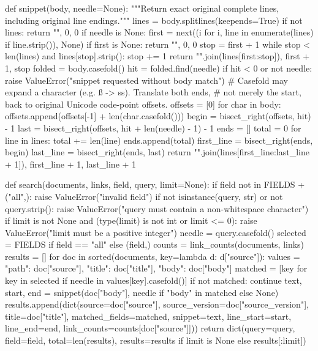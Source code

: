 def snippet(body, needle=None):
    """Return exact original complete lines, including original line endings."""
    lines = body.splitlines(keepends=True)
    if not lines:
        return "", 0, 0
    if needle is None:
        first = next((i for i, line in enumerate(lines) if line.strip()), None)
        if first is None:
            return "", 0, 0
        stop = first + 1
        while stop < len(lines) and lines[stop].strip():
            stop += 1
        return "".join(lines[first:stop]), first + 1, stop
    folded = body.casefold()
    hit = folded.find(needle)
    if hit < 0 or not needle:
        raise ValueError("snippet requested without body match")
    # Casefold may expand a character (e.g. ß -> ss). Translate both ends,
    # not merely the start, back to original Unicode code-point offsets.
    offsets = [0]
    for char in body:
        offsets.append(offsets[-1] + len(char.casefold()))
    begin = bisect_right(offsets, hit) - 1
    last = bisect_right(offsets, hit + len(needle) - 1) - 1
    ends = []
    total = 0
    for line in lines:
        total += len(line)
        ends.append(total)
    first_line = bisect_right(ends, begin)
    last_line = bisect_right(ends, last)
    return "".join(lines[first_line:last_line + 1]), first_line + 1, last_line + 1

def search(documents, links, field, query, limit=None):
    if field not in FIELDS + ("all",):
        raise ValueError("invalid field")
    if not isinstance(query, str) or not query.strip():
        raise ValueError("query must contain a non-whitespace character")
    if limit is not None and (type(limit) is not int or limit <= 0):
        raise ValueError("limit must be a positive integer")
    needle = query.casefold()
    selected = FIELDS if field == "all" else (field,)
    counts = link_counts(documents, links)
    results = []
    for doc in sorted(documents, key=lambda d: d["source"]):
        values = {"path": doc["source"], "title": doc["title"], "body": doc["body"]}
        matched = [key for key in selected if needle in values[key].casefold()]
        if not matched:
            continue
        text, start, end = snippet(doc["body"], needle if "body" in matched else None)
        results.append(dict(source=doc["source"], source_version=doc["source_version"],
                            title=doc["title"], matched_fields=matched, snippet=text,
                            line_start=start, line_end=end, link_counts=counts[doc["source"]]))
    return dict(query=query, field=field, total=len(results),
                results=results if limit is None else results[:limit])

